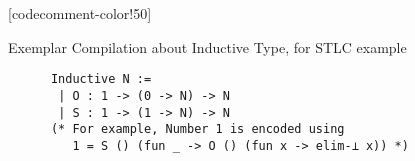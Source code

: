 \begin{figure}[!htb]
\begin{minipage}{\textwidth}
\begin{multicols}{2}
  
  
  [codecomment-color!50]
  

  \end{multicols}
  \end{minipage}
  
  \caption{Exemplar Compilation about Inductive Type, for STLC example}\label{fig:plugin-example2}
  \end{figure}

\begin{figure}
  \begin{minipage}{\linewidth}
    \begin{verbatim}
      Inductive N :=
       | O : 1 -> (0 -> N) -> N 
       | S : 1 -> (1 -> N) -> N
      (* For example, Number 1 is encoded using
         1 = S () (fun _ -> O () (fun x -> elim-⊥ x)) *)
    \end{verbatim}
  \end{minipage}


\end{figure}
